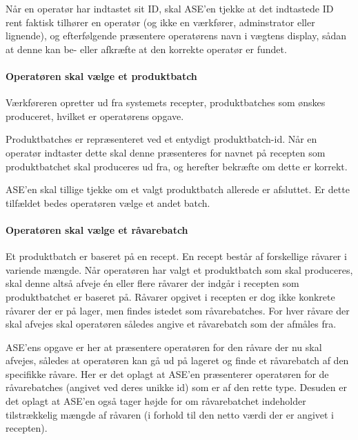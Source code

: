 \documentclass[a4paper]{article}
\begin{document}
Når en operatør har indtastet sit ID, skal ASE'en tjekke at det indtastede ID rent faktisk tilhører en operatør (og ikke en værkfører, adminstrator eller lignende), og efterfølgende præsentere operatørens navn i vægtens display, sådan at denne kan be- eller afkræfte at den korrekte operatør er fundet.


\paragraph{Operatøren skal vælge et produktbatch} %

Værkføreren opretter ud fra systemets recepter, produktbatches som ønskes produceret, hvilket er operatørens opgave.

Produktbatches er repræsenteret ved et entydigt produktbatch-id. Når en operatør indtaster dette skal denne præsenteres for navnet på recepten som produktbatchet skal produceres ud fra, og herefter bekræfte om dette er korrekt.

ASE'en skal tillige tjekke om et valgt produktbatch allerede er afsluttet. Er dette tilfældet bedes operatøren vælge et andet batch.


\paragraph{Operatøren skal vælge et råvarebatch} %

Et produktbatch er baseret på en recept. En recept består af forskellige råvarer i variende mængde. Når operatøren har valgt et produktbatch som skal produceres, skal denne altså afveje én eller flere råvarer der indgår i recepten som produktbatchet er baseret på. Råvarer opgivet i recepten er dog ikke konkrete råvarer der er på lager, men findes istedet som råvarebatches. For hver råvare der skal afvejes skal operatøren således angive et råvarebatch som der afmåles fra.

ASE'ens opgave er her at præsentere operatøren for den råvare der nu skal afvejes, således at operatøren kan gå ud på lageret og finde et råvarebatch af den specifikke råvare. Her er det oplagt at ASE'en præsenterer operatøren for de råvarebatches (angivet ved deres unikke id) som er af den rette type. Desuden er det oplagt at ASE'en også tager højde for om råvarebatchet indeholder tilstrækkelig mængde af råvaren (i forhold til den netto værdi der er angivet i recepten).
\end{document}

